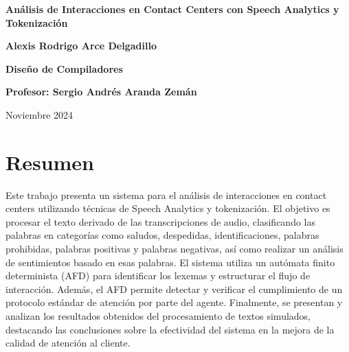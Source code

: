 \documentclass[12pt,a4paper]{article}
\begin{document}
\begin{titlepage}
	\begin{center}
		\vspace*{1cm}

		\textbf{\LARGE{Análisis de Interacciones en Contact Centers con
				Speech Analytics y Tokenización}}

		\vspace{2cm}

		\textbf{\large{Alexis Rodrigo Arce Delgadillo}}

		\vfill

		\textbf{\large{Diseño de Compiladores}}

		\vspace{0.5cm}

		\textbf{\large{Profesor: Sergio Andrés Aranda Zemán}}

		\vspace{1.5cm}

		Noviembre 2024

		\vfill

	\end{center}
\end{titlepage}

\vspace{7mm}


\tableofcontents
\newpage

\section*{\centering Resumen}
Este trabajo presenta un sistema para el análisis de interacciones en contact centers
utilizando técnicas de Speech Analytics y tokenización. El objetivo es procesar el texto
derivado de las transcripciones de audio, clasificando las palabras en categorías como saludos,
despedidas, identificaciones, palabras prohibidas, palabras positivas y palabras negativas, así
como realizar un análisis de sentimientos basado en esas palabras. El sistema utiliza un
autómata finito determinista (AFD) para identificar los lexemas y estructurar el flujo de
interacción. Además, el AFD permite detectar y verificar el cumplimiento de un protocolo
estándar de atención por parte del agente. Finalmente, se presentan y analizan los resultados
obtenidos del procesamiento de textos simulados, destacando las conclusiones sobre la
efectividad del sistema en la mejora de la calidad de atención al cliente.
\end{document}
